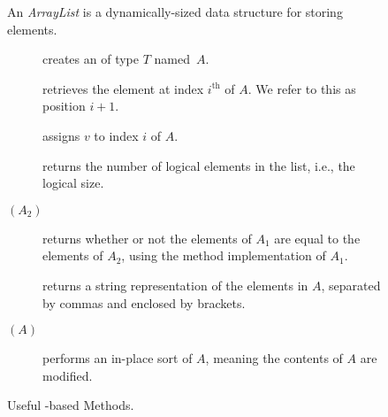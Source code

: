 \begin{figure}[tp]
  \small
  \begin{tcolorbox}[title=Java Array Lists]
    An \textit{ArrayList} is a dynamically-sized data structure for storing elements.
    \vspace{2ex}
  \begin{description}
    \item [] creates an  of type $T$ named~$A$.
    \item [] retrieves the element at index $i^{\text{th}}$ of $A$. We refer to this as position $i + 1$. 
    \item [] assigns $v$ to index $i$ of $A$.
    \item [] returns the number of logical elements in the list, i.e., the logical size.
    \item [$(A_2)$] returns whether or not the elements of $A_1$ are equal to the elements of $A_2$, using the  method implementation of $A_1$.
    \item [] returns a string representation of the elements in $A$, separated by commas and enclosed by brackets.
    \item [$(A)$] performs an in-place sort of $A$, meaning the contents of $A$ are modified.
  \end{description}
\end{tcolorbox}
  \caption{Useful -based Methods.}
  \label{fig:arraylists}
\end{figure}

